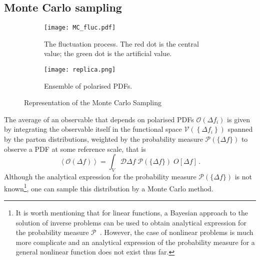 \subsection{Monte Carlo sampling}
\label{sec:MCS}
\begin{figure}[t]
  \centering
  \begin{subfigure}[b]{0.45\textwidth}
      \centering
      \texttt{[image: MC\_fluc.pdf]}
      \caption{The fluctuation process. The red dot is the central value; the green dot is the artificial value.}
      \label{fig:MC_fluc}
  \end{subfigure}
  \hfill
  \begin{subfigure}[b]{0.45\textwidth}
      \centering
      \texttt{[image: replica.png]}
      \caption{Ensemble of polarised PDFs.}
      \label{fig:PDF_ensemble}
  \end{subfigure}
     \caption{Representation of the Monte Carlo Sampling}
     \label{fig:MC_2_Gr}
\end{figure}
The average of an observable that depends on polarised PDFs $\mathcal{O}(\Delta f_i)$ is given by integrating the observable itself in the functional space $\mathcal{V}\left( \left\{ \Delta f_i \right\}\right)$ spanned by the parton distributions, weighted by the probability measure $\mathcal{P}\left(\{\Delta f\}\right)$ to observe a PDF at some reference scale, that is \cite*{Nocera:2014vla}
\begin{equation}
  \left< \mathcal{O}(\Delta f) \right> = \int_{V} \mathcal{D} \Delta f \; \mathcal{P}\left( \{\Delta f \}\right) \; O \left[ \Delta f \right] \,.
\end{equation}
Although the analytical expression for the probability measure $\mathcal{P}\left( \{\Delta f \}\right)$ is not known\footnote{\footnotesize It is worth mentioning that for linear functions, a Bayesian approach to the solution of inverse problems can be used to obtain analytical expression for the probability measure $\mathcal{P}$~\cite{DelDebbio:2021whr}. However, the case of nonlinear problems is much more complicate and an analytical expression of the probability measure for a general nonlinear function does not exist thus far.}, one can sample this distribution by a Monte Carlo method.%

